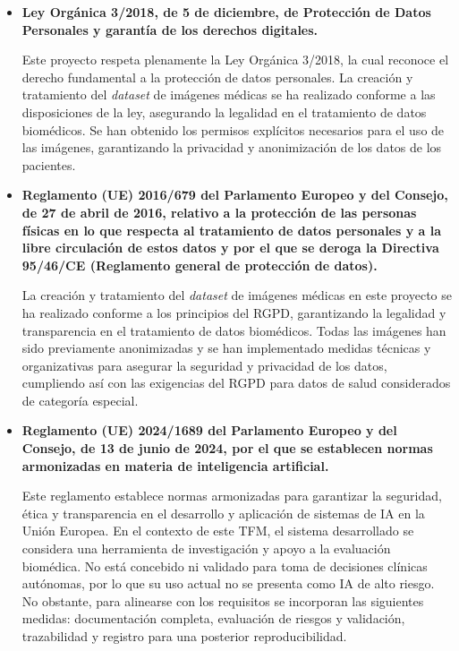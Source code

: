 \documentclass[12pt,a4paper,onecolumn,oneside]{report}
\begin{document}
\begin{itemize}
    \item \textbf{Ley Orgánica 3/2018, de 5 de diciembre, de Protección de Datos Personales y garantía de los derechos digitales.}\cite{LOPD2018}
    
    Este proyecto respeta plenamente la Ley Orgánica 3/2018, la cual reconoce el derecho fundamental a la protección de datos personales. 
    La creación y tratamiento del \textit{dataset} de imágenes médicas se ha realizado conforme a las disposiciones de la ley, asegurando la legalidad en el tratamiento de datos biomédicos. 
    Se han obtenido los permisos explícitos necesarios para el uso de las imágenes, garantizando la privacidad y anonimización de los datos de los pacientes. 
    
    \item \textbf{Reglamento (UE) 2016/679 del Parlamento Europeo y del Consejo, de 27 de abril de 2016, relativo a la protección de las personas físicas en lo que respecta al tratamiento de datos personales y a la libre circulación de estos datos y por el que se deroga la Directiva 95/46/CE (Reglamento general de protección de datos).}\cite{RGPD2016}

    La creación y tratamiento del \textit{dataset} de imágenes médicas en este proyecto se ha realizado conforme a los principios del RGPD, garantizando la legalidad y transparencia en el 
    tratamiento de datos biomédicos. Todas las imágenes han sido previamente anonimizadas y se han implementado medidas técnicas y organizativas 
    para asegurar la seguridad y privacidad de los datos, cumpliendo así con las exigencias del RGPD para datos de salud considerados de categoría 
    especial.
    
    \item \textbf{Reglamento (UE) 2024/1689 del Parlamento Europeo y del Consejo, de 13 de junio de 2024, por el que se establecen normas armonizadas en materia de inteligencia artificial.}\cite{ReglamentoIA2024}

    Este reglamento establece normas armonizadas para garantizar la seguridad, ética y transparencia en el desarrollo y aplicación de sistemas de IA en la Unión Europea.  
    En el contexto de este TFM, el sistema desarrollado se considera una herramienta de investigación y apoyo a la evaluación biomédica. No está concebido ni validado para toma de decisiones clínicas autónomas,
    por lo que su uso actual no se presenta como IA de alto riesgo. No obstante, para alinearse con los requisitos se incorporan las siguientes medidas: documentación completa, evaluación de riesgos y validación, 
    trazabilidad y registro para una posterior reproducibilidad.
    

\end{itemize}
\end{document}
